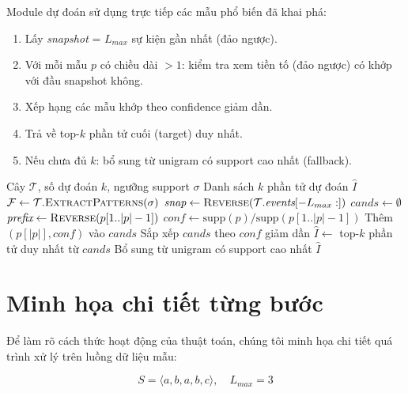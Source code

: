\documentclass[14pt,a4paper,oneside]{extreport}
\begin{document}
Module dự đoán sử dụng trực tiếp các mẫu phổ biến đã khai phá:

\begin{enumerate}
    \item Lấy \textit{snapshot} = $L_{max}$ sự kiện gần nhất (đảo ngược).
    \item Với mỗi mẫu $p$ có chiều dài $> 1$: kiểm tra xem tiền tố (đảo ngược) có khớp với đầu snapshot không.
    \item Xếp hạng các mẫu khớp theo confidence giảm dần.
    \item Trả về top-$k$ phần tử cuối (target) duy nhất.
    \item Nếu chưa đủ $k$: bổ sung từ unigram có support cao nhất (fallback).
\end{enumerate}

\begin{algorithm}[!ht]
\small
\caption{Dự đoán phần tử tiếp theo}
\label{alg:predict}
\begin{algorithmic}[1]
\REQUIRE Cây $\mathcal{T}$, số dự đoán $k$, ngưỡng support $\sigma$
\ENSURE Danh sách $k$ phần tử dự đoán $\hat{I}$
\STATE $\mathcal{F} \leftarrow \mathcal{T}.\textsc{ExtractPatterns}(\sigma)$
\STATE $\textit{snap} \leftarrow \textsc{Reverse}(\mathcal{T}.\textit{events}[-L_{max}:])$
\STATE $\textit{cands} \leftarrow \emptyset$
    \STATE $\textit{prefix} \leftarrow \textsc{Reverse}(p[1..|p|-1])$
        \STATE $\textit{conf} \leftarrow \text{supp}(p) / \text{supp}(p[1..|p|-1])$
        \STATE Thêm $(p[|p|], \textit{conf})$ vào $\textit{cands}$
    \ENDIF
\ENDFOR
\STATE Sắp xếp $\textit{cands}$ theo $\textit{conf}$ giảm dần
\STATE $\hat{I} \leftarrow$ top-$k$ phần tử duy nhất từ $\textit{cands}$
    \STATE Bổ sung từ unigram có support cao nhất 
\ENDIF
\RETURN $\hat{I}$
\end{algorithmic}
\end{algorithm}
\vspace{-0.5em}

\section{Minh họa chi tiết từng bước}
\label{sec:trace}

Để làm rõ cách thức hoạt động của thuật toán, chúng tôi minh họa chi tiết quá trình xử lý trên luồng dữ liệu mẫu:

$$S = \langle a, b, a, b, c \rangle, \quad L_{max} = 3$$
\end{document}

